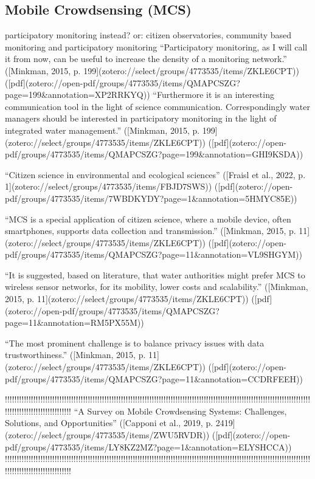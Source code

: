 {%

\subsection{Mobile Crowdsensing (MCS)}

participatory monitoring instead? or: citizen observatories, community based monitoring and participatory monitoring
“Participatory monitoring, as I will call it from now, can be useful to increase the density of a monitoring network.” ([Minkman, 2015, p. 199](zotero://select/groups/4773535/items/ZKLE6CPT)) ([pdf](zotero://open-pdf/groups/4773535/items/QMAPCSZG?page=199&annotation=XP2RRKYQ))
“Furthermore it is an interesting communication tool in the light of science communication. Correspondingly water managers should be interested in participatory monitoring in the light of integrated water management.” ([Minkman, 2015, p. 199](zotero://select/groups/4773535/items/ZKLE6CPT)) ([pdf](zotero://open-pdf/groups/4773535/items/QMAPCSZG?page=199&annotation=GHI9KSDA))


“Citizen science in environmental and ecological sciences” ([Fraisl et al., 2022, p. 1](zotero://select/groups/4773535/items/FBJD7SWS)) ([pdf](zotero://open-pdf/groups/4773535/items/7WBDKYDY?page=1&annotation=5HMYC85E))

“MCS is a special application of citizen science, where a mobile device, often smartphones, supports data collection and transmission.” ([Minkman, 2015, p. 11](zotero://select/groups/4773535/items/ZKLE6CPT)) ([pdf](zotero://open-pdf/groups/4773535/items/QMAPCSZG?page=11&annotation=VL9SHGYM))

“It is suggested, based on literature, that water authorities might prefer MCS to wireless sensor networks, for its mobility, lower costs and scalability.” ([Minkman, 2015, p. 11](zotero://select/groups/4773535/items/ZKLE6CPT)) ([pdf](zotero://open-pdf/groups/4773535/items/QMAPCSZG?page=11&annotation=RM5PX55M))

“The most prominent challenge is to balance privacy issues with data trustworthiness.” ([Minkman, 2015, p. 11](zotero://select/groups/4773535/items/ZKLE6CPT)) ([pdf](zotero://open-pdf/groups/4773535/items/QMAPCSZG?page=11&annotation=CCDRFEEH))

!!!!!!!!!!!!!!!!!!!!!!!!!!!!!!!!!!!!!!!!!!!!!!!!!!!!!!!!!!!!!!!!!!!!!!!!!!!!!!!!!!!!!!!!!!!!!!!!!!!!!!!!!!!!!!!!!!!!!!!!!!!!!!!!!!!!!!!!!!!!!!!!!!!!!!!!!!!!!
“A Survey on Mobile Crowdsensing Systems: Challenges, Solutions, and Opportunities” ([Capponi et al., 2019, p. 2419](zotero://select/groups/4773535/items/ZWU5RVDR)) ([pdf](zotero://open-pdf/groups/4773535/items/LY8KZ2MZ?page=1&annotation=ELYSHCCA))
!!!!!!!!!!!!!!!!!!!!!!!!!!!!!!!!!!!!!!!!!!!!!!!!!!!!!!!!!!!!!!!!!!!!!!!!!!!!!!!!!!!!!!!!!!!!!!!!!!!!!!!!!!!!!!!!!!!!!!!!!!!!!!!!!!!!!!!!!!!!!!!!!!!!!!!!!!!!!

}
